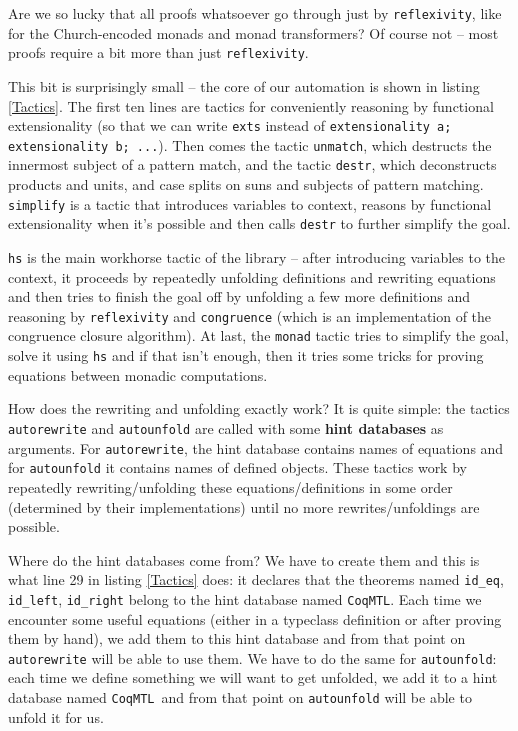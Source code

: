 \documentclass[declaration,inz,english,shortabstract]{iithesis}
\newcommand{\m}[1]{\texttt{#1}}
\newcommand{\hintdb}{\m{CoqMTL}}
\begin{document}
Are we so lucky that all proofs whatsoever go through just by \m{reflexivity}, like for the Church-encoded monads and monad transformers? Of course not -- most proofs require a bit more than just \m{reflexivity}.

This bit is surprisingly small -- the core of our automation is shown in listing \ref{Tactics}. The first ten lines are tactics for conveniently reasoning by functional extensionality (so that we can write \m{exts} instead of \m{extensionality a; extensionality b; ...}). Then comes the tactic \m{unmatch}, which destructs the innermost subject of a pattern match, and the tactic \m{destr}, which deconstructs products and units, and case splits on suns and subjects of pattern matching. \m{simplify} is a tactic that introduces variables to context, reasons by functional extensionality when it's possible and then calls \m{destr} to further simplify the goal.

\m{hs} is the main workhorse tactic of the library -- after introducing variables to the context, it proceeds by repeatedly unfolding definitions and rewriting equations and then tries to finish the goal off by unfolding a few more definitions and reasoning by \m{reflexivity} and \m{congruence} (which is an implementation of the congruence closure algorithm). At last, the \m{monad} tactic tries to simplify the goal, solve it using \m{hs} and if that isn't enough, then it tries some tricks for proving equations between monadic computations.

How does the rewriting and unfolding exactly work? It is quite simple: the tactics \m{autorewrite} and \m{autounfold} are called with some \textbf{hint databases} as arguments. For \m{autorewrite}, the hint database contains names of equations and for \m{autounfold} it contains names of defined objects. These tactics work by repeatedly rewriting/unfolding these equations/definitions in some order (determined by their implementations) until no more rewrites/unfoldings are possible.

Where do the hint databases come from? We have to create them and this is what line 29 in listing \ref{Tactics} does: it declares that the theorems named \m{id\_eq}, \m{id\_left}, \m{id\_right} belong to the hint database named \hintdb. Each time we encounter some useful equations (either in a typeclass definition or after proving them by hand), we add them to this hint database and from that point on \m{autorewrite} will be able to use them. We have to do the same for \m{autounfold}: each time we define something we will want to get unfolded, we add it to a hint database named \hintdb\ and from that point on \m{autounfold} will be able to unfold it for us.
\end{document}
